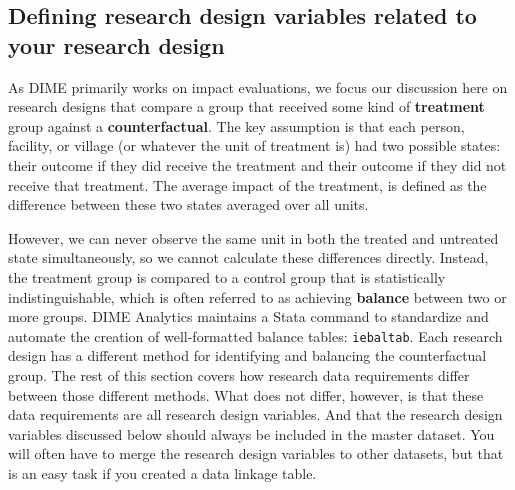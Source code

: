 \subsection{Defining research design variables related to your research design}

As DIME primarily works on impact evaluations,
we focus our discussion here on research designs
that compare a group that received
some kind of \textbf{treatment}
group against a \textbf{counterfactual}.
The key assumption is that each
person, facility, or village
(or whatever the unit of treatment is)
had two possible states: their outcome if they did receive the treatment
and their outcome if they did not receive that treatment.
The average impact of the treatment,
is defined as the difference
between these two states averaged over all units.

However, we can never observe the same unit
in both the treated and untreated state simultaneously,
so we cannot calculate these differences directly.
Instead, the treatment group is compared to a control group
that is statistically indistinguishable,
which is often referred to as achieving
\textbf{balance} between two or more groups.
DIME Analytics maintains a Stata command to
standardize and automate the creation of well-formatted balance tables:
\texttt{iebaltab}.
Each research design has a different method for
identifying and balancing the counterfactual group.
The rest of this section covers how research data requirements
differ between those different methods.
What does not differ, however,
is that these data requirements are all research design variables.
And that the research design variables discussed below
should always be included in the master dataset.
You will often have to merge
the research design variables to other datasets,
but that is an easy task
if you created a data linkage table.

